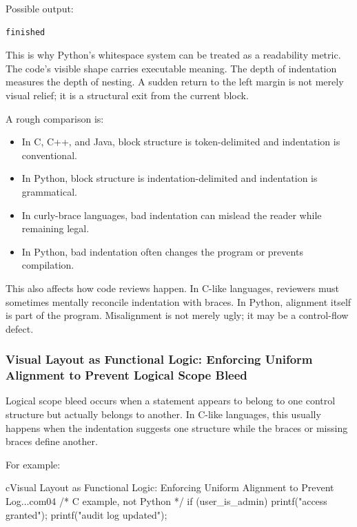 \documentclass[a4paper,twoside]{report}
\begin{document}
Possible output:

\begin{verbatim}
finished
\end{verbatim}

This is why Python's whitespace system can be treated as a readability metric. The code's visible shape carries executable meaning. The depth of indentation measures the depth of nesting. A sudden return to the left margin is not merely visual relief; it is a structural exit from the current block.

A rough comparison is:

\begin{itemize}
    \item In C, C++, and Java, block structure is token-delimited and indentation is conventional.
    \item In Python, block structure is indentation-delimited and indentation is grammatical.
    \item In curly-brace languages, bad indentation can mislead the reader while remaining legal.
    \item In Python, bad indentation often changes the program or prevents compilation.
\end{itemize}

This also affects how code reviews happen. In C-like languages, reviewers must sometimes mentally reconcile indentation with braces. In Python, alignment itself is part of the program. Misalignment is not merely ugly; it may be a control-flow defect.

\subsubsection{Visual Layout as Functional Logic: Enforcing Uniform Alignment to Prevent Logical Scope Bleed}

Logical scope bleed occurs when a statement appears to belong to one control structure but actually belongs to another. In C-like languages, this usually happens when the indentation suggests one structure while the braces or missing braces define another.

For example:

\begin{codebox}[]{c}{Visual Layout as Functional Logic: Enforcing Uniform Alignment to Prevent Log...}{com04}
/* C example, not Python */
if (user_is_admin)
    printf("access granted\n");
    printf("audit log updated\n");
\end{codebox}
\end{document}
